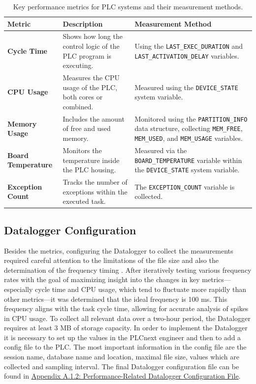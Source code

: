 \documentclass[Master,BMR,english]{twbook}
\begin{document}
\begin{table}[!htbp]
\centering
\begin{tabular}{|l|p{5cm}|p{6cm}|}
\hline
\textbf{Metric} & \textbf{Description} & \textbf{Measurement Method} \\ \hline
\textbf{Cycle Time} & Shows how long the control logic of the PLC program is executing.& Using the  \texttt{LAST\_EXEC\_DURATION} and \texttt{LAST\_ACTIVATION\_DELAY} variables.\\ \hline
\textbf{CPU Usage} & Measures the CPU usage of the PLC, both cores or combined.& Measured using the \texttt{DEVICE\_STATE} system variable.\\ \hline
\textbf{Memory Usage} & Includes the amount of free and used memory.& Monitored using the \texttt{PARTITION\_INFO} data structure, collecting \texttt{MEM\_FREE}, \texttt{MEM\_USED}, and \texttt{MEM\_USAGE} variables. \\ \hline
\textbf{Board Temperature} & Monitors the temperature inside the PLC housing.& Measured via the \texttt{BOARD\_TEMPERATURE} variable within the \texttt{DEVICE\_STATE} system variable. \\ \hline
\textbf{Exception Count} & Tracks the number of exceptions within the executed task. & The \texttt{EXCEPTION\_COUNT} variable is collected. \\ \hline
\end{tabular}
\caption{Key performance metrics for PLC systems and their measurement methods.}
\label{tab:plc_metrics}
\end{table}

\subsection{Datalogger Configuration}
Besides the metrics, configuring the Datalogger to collect the measurements required careful attention to the limitations of the file size and also the determination of the frequency timing \cite{plcnext_datalogger}. After iteratively testing various frequency rates with the goal of maximizing insight into the changes in key metrics—especially cycle time and CPU usage, which tend to fluctuate more rapidly than other metrics—it was determined that the ideal frequency is 100 ms. This frequency aligns with the task cycle time, allowing for accurate analysis of spikes in CPU usage. To collect all relevant data over a two-hour period, the Datalogger requires at least 3 MB of storage capacity. In order to implement the Datalogger it is necessary to set up the values in the PLCnext engineer and then to add a config file to the PLC. The most important information in the config file are the session name, database name and location, maximal file size, values which are collected and sampling interval. The final Datalogger configuration file can be found in \hyperref[sec:performance_datalogger]{Appendix A.1.2: Performance-Related Datalogger Configuration File}.
 
\end{document}
